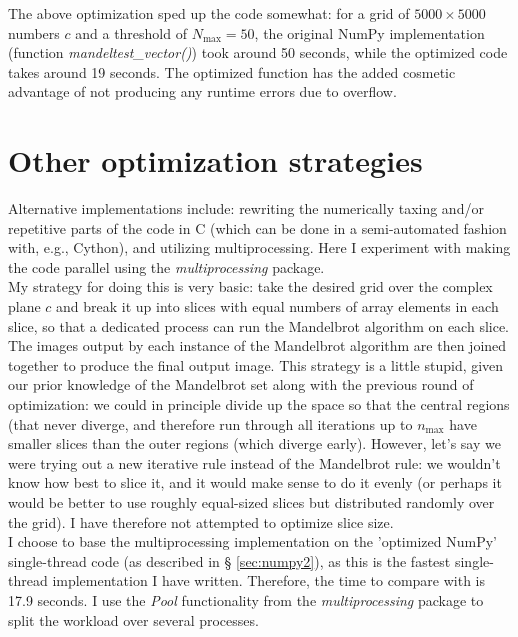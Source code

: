 \documentclass[paper=a4, fontsize=11pt]{scrartcl} %
\numberwithin{equation}{section} %
\numberwithin{figure}{section} %
\numberwithin{table}{section} %
\begin{document}
The above optimization sped up the code somewhat: for a grid of $5000\times5000$ numbers $c$ and a threshold of $N_\mathrm{max}=50$, the original NumPy implementation (function \emph{mandeltest\_vector()}) took around 50 seconds, while the optimized code takes around 19 seconds. The optimized function has the added cosmetic advantage of not producing any runtime errors due to overflow.

\section{Other optimization strategies}\label{sec:multithread}

Alternative implementations include: rewriting the numerically taxing and/or repetitive parts of the code in C (which can be done in a semi-automated fashion with, e.g., Cython), and utilizing multiprocessing. Here I experiment with making the code parallel using the \emph{multiprocessing} package.\\

My strategy for doing this is very basic: take the desired grid over the complex plane $c$ and break it up into slices with equal numbers of array elements in each slice, so that a dedicated process can run the Mandelbrot algorithm on each slice. The images output by each instance of the Mandelbrot algorithm are then joined together to produce the final output image. This strategy is a little stupid, given our prior knowledge of the Mandelbrot set along with the previous round of optimization: we could in principle divide up the space so that the central regions (that never diverge, and therefore run through all iterations up to $n_\mathrm{max}$ have smaller slices than the outer regions (which diverge early). However, let's say we were trying out a new iterative rule instead of the Mandelbrot rule: we wouldn't know how best to slice it, and it would make sense to do it evenly (or perhaps it would be better to use roughly equal-sized slices but distributed randomly over the grid). I have therefore not attempted to optimize slice size.\\

I choose to base the multiprocessing implementation on the 'optimized NumPy' single-thread code (as described in § \ref{sec:numpy2}), as this is the fastest single-thread implementation I have written. Therefore, the time to compare with is 17.9 seconds. I use the \emph{Pool} functionality from the \emph{multiprocessing} package to split the workload over several processes.\\ 
\end{document}
